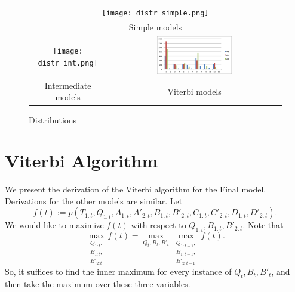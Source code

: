 \documentclass[11pt]{article}
\begin{document}
\begin{small}
\begin{figure}[ht]
\begin{tabular}{cc}
\multicolumn{2}{c}{
\texttt{[image: distr\_simple.png]}
}\\
\multicolumn{2}{c}{Simple models}\\
\texttt{[image: distr\_int.png]}&\includegraphics[width=0.45\textwidth]{distr_vit.png}\\
Intermediate models & Viterbi models\\
\end{tabular}
\caption{Distributions}
\end{figure}

\clearpage
\section{Viterbi Algorithm}

We present the derivation of the Viterbi algorithm for the Final model. Derivations for the other models are similar.
Let \[f(t) := p(T_{1:t}, Q_{1:t}, A_{1:t}, A'_{2:t}, B_{1:t}, B'_{2:t}, C_{1:t}, C'_{2:t}, D_{1:t}, D'_{2:t}).\]
We would like to maximize $f(t)$ with respect to $Q_{1:t}, B_{1:t}, B'_{2:t}$. Note that
\[\max_{\substack{Q_{1:t},\\B_{1:t},\\B'_{2:t}}}f(t)=\max_{Q_t, B_t, B'_t}\max_{\substack{Q_{1:t-1},\\B_{1:t-1},\\B'_{2:t-1}}}f(t).\]
So, it suffices to find the inner maximum for every instance of $Q_t, B_t, B'_t$, and then take the maximum over these three variables.


\end{small}
\end{document}
